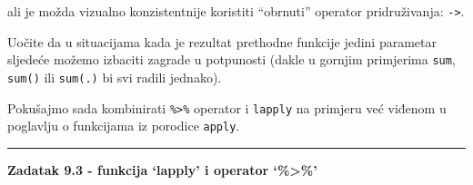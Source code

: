 \documentclass[]{book}
\newenvironment{Shaded}{\begin{snugshade}}{\end{snugshade}}
\newcommand{\KeywordTok}[1]{\textcolor[rgb]{0.13,0.29,0.53}{\textbf{#1}}}
\newcommand{\DataTypeTok}[1]{\textcolor[rgb]{0.13,0.29,0.53}{#1}}
\newcommand{\DecValTok}[1]{\textcolor[rgb]{0.00,0.00,0.81}{#1}}
\newcommand{\StringTok}[1]{\textcolor[rgb]{0.31,0.60,0.02}{#1}}
\newcommand{\CommentTok}[1]{\textcolor[rgb]{0.56,0.35,0.01}{\textit{#1}}}
\newcommand{\OperatorTok}[1]{\textcolor[rgb]{0.81,0.36,0.00}{\textbf{#1}}}
\newcommand{\NormalTok}[1]{#1}
\theoremstyle{definition}
\theoremstyle{definition}
\theoremstyle{definition}
\theoremstyle{remark}
\begin{document}
ali je možda vizualno konzistentnije koristiti ``obrnuti'' operator
pridruživanja: \texttt{-\textgreater{}}.

\begin{Shaded}
\end{Shaded}

Uočite da u situacijama kada je rezultat prethodne funkcije jedini
parametar sljedeće možemo izbaciti zagrade u potpunosti (dakle u gornjim
primjerima \texttt{sum}, \texttt{sum()} ili \texttt{sum(.)} bi svi
radili jednako).

Pokušajmo sada kombinirati \texttt{\%\textgreater{}\%} operator i
\texttt{lapply} na primjeru već viđenom u poglavlju o funkcijama iz
porodice \texttt{apply}.

\begin{center}\rule{0.5\linewidth}{\linethickness}\end{center}

\textbf{Zadatak 9.3 - funkcija `lapply' i operator `\%\textgreater{}\%'}

\begin{Shaded}
\end{Shaded}
\end{document}
